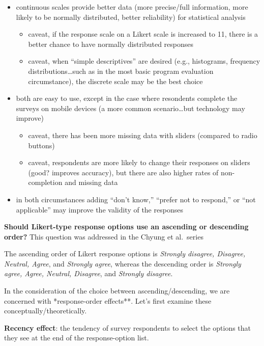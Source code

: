 \documentclass[
  english,
]{book}
\providecommand{\tightlist}{%
  \setlength{\itemsep}{0pt}\setlength{\parskip}{0pt}}
\begin{document}
\begin{itemize}
\tightlist
\item
  continuous scales provide better data (more precise/full information, more likely to be normally distributed, better reliability) for statistical analysis

  \begin{itemize}
  \tightlist
  \item
    caveat, if the response scale on a Likert scale is increased to 11, there is a better chance to have normally distributed responses
  \item
    caveat, when ``simple descriptives'' are desired (e.g., histograms, frequency distributions\ldots such as in the most basic program evaluation circumstance), the discrete scale may be the best choice
  \end{itemize}
\item
  both are easy to use, except in the case where resondents complete the surveys on mobile devices (a more common scenario\ldots but technology may improve)

  \begin{itemize}
  \tightlist
  \item
    caveat, there has been more missing data with sliders (compared to radio buttons)
  \item
    caveat, respondents are more likely to change their responses on sliders (good? improves accuracy), but there are also higher rates of non-completion and missing data
  \end{itemize}
\item
  in both circumstances adding ``don't know,'' ``prefer not to respond,'' or ``not applicable'' may improve the validity of the responses
\end{itemize}

\textbf{Should Likert-type response options use an ascending or descending order?} This question was addressed in the Chyung et al.~series \citep{chyung_evidence-based_2018}

The ascending order of Likert response options is \emph{Strongly disagree, Disagree, Neutral, Agree}, and \emph{Strongly agree}, whereas the descending order is \emph{Strongly agree, Agree, Neutral, Disagree}, and \emph{Strongly disagree}.

In the consideration of the choice between ascending/descending, we are concerned with *response-order effects**. Let's first examine these conceptually/theoretically.

\textbf{Recency effect}: the tendency of survey respondents to select the options that they see at the end of the response-option list.
\end{document}
